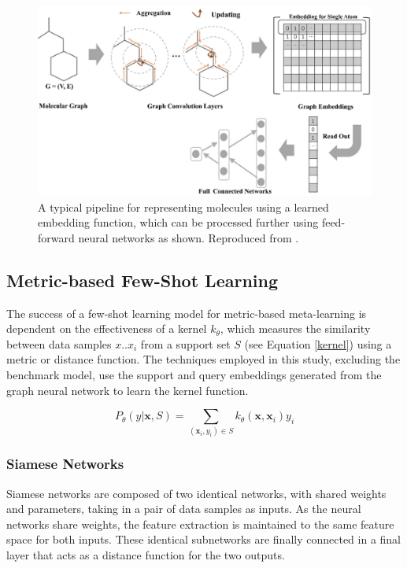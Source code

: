 \begin{figure}[h]
	\centering
	\includegraphics[width=0.9\linewidth]{img/graph_mol_embedding.png}
	\caption[Learned Embedding through a GCN]{A typical pipeline for representing molecules using a learned embedding function, which can be processed further using feed-forward neural networks as shown. Reproduced from \citet{jiang2021could}.}
	\label{fig:neuralgraphfingerprint}
  \end{figure}

\subsection{Metric-based Few-Shot Learning}

The success of a few-shot learning model for metric-based meta-learning is dependent on the effectiveness of a kernel $k_\theta$, which measures the similarity between data samples ${x..x_i}$ from a support set $S$ (see Equation \ref{kernel}) using a metric or distance function. The techniques employed in this study, excluding the benchmark model, use the support and query embeddings generated from the graph neural network to learn the kernel function.

\begin{equation}
	\label{kernel}
	P_\theta(y \vert \mathbf{x}, S) = \sum_{(\mathbf{x}_i, y_i) \in S} k_\theta(\mathbf{x}, \mathbf{x}_i)y_i
\end{equation}

\subsubsection{Siamese Networks}

Siamese networks \cite{bromley1993signature, koch2015siamese} are composed of two identical networks, with shared weights and parameters, taking in a pair of data samples as inputs. As the neural networks share weights, the feature extraction is maintained to the same feature space for both inputs. These identical subnetworks are finally connected in a final layer that acts as a distance function for the two outputs.

